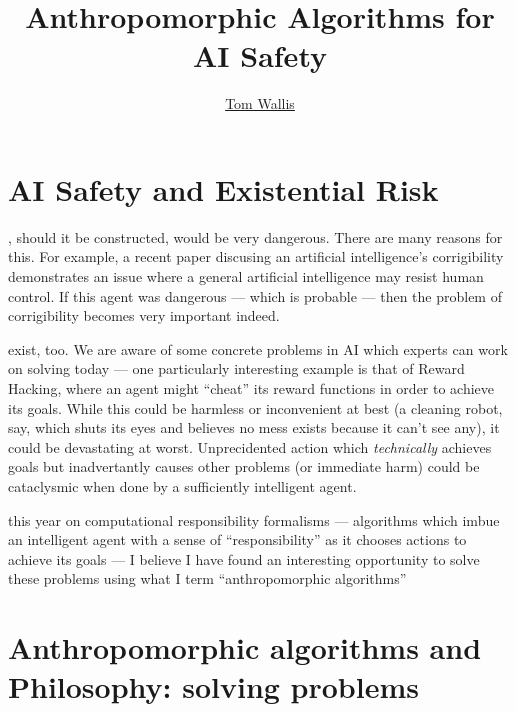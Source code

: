 
\title{Anthropomorphic Algorithms for AI Safety}
\author[Tom Wallis]{\href{http://tom.coffee}{Tom Wallis}}
\date{}



\maketitle

\section{AI Safety and Existential Risk}

, should it be constructed, would be very dangerous. There are many reasons for this. For example, a recent paper discusing an artificial intelligence's corrigibility\cite{corrigability} demonstrates an issue where a general artificial intelligence may resist human control. If this agent was dangerous --- which is probable --- then the problem of corrigibility becomes very important indeed.\par

 exist, too. We are aware of some concrete problems in AI which experts can work on solving today\cite{concrete_problems} --- one particularly interesting example is that of Reward Hacking, where an agent might ``cheat'' its reward functions in order to achieve its goals. While this could be harmless or inconvenient at best (a cleaning robot, say, which shuts its eyes and believes no mess exists because it can't see any), it could be devastating at worst. Unprecidented action which \emph{technically} achieves goals but inadvertantly causes other problems (or immediate harm) could be cataclysmic when done by a sufficiently intelligent agent.\par

 this year on computational responsibility formalisms --- algorithms which imbue an intelligent agent with a sense of ``responsibility'' as it chooses actions to achieve its goals --- I believe I have found an interesting opportunity to solve these problems using what I term ``anthropomorphic algorithms''

\section{Anthropomorphic algorithms and Philosophy: solving problems}

